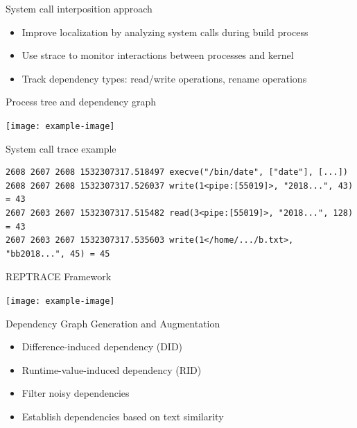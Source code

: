 \documentclass{beamer}
\begin{document}
\begin{frame}{System call interposition approach}
\begin{itemize}
\item Improve localization by analyzing system calls during build process
\item Use strace to monitor interactions between processes and kernel
\item Track dependency types: read/write operations, rename operations
\end{itemize}
\end{frame}

\begin{frame}{Process tree and dependency graph}
\begin{center}
\texttt{[image: example-image]}
\end{center}
\end{frame}

\begin{frame}[fragile]{System call trace example}
\begin{scriptsize}
\begin{verbatim}
2608 2607 2608 1532307317.518497 execve("/bin/date", ["date"], [...])
2608 2607 2608 1532307317.526037 write(1<pipe:[55019]>, "2018...", 43) = 43
2607 2603 2607 1532307317.515482 read(3<pipe:[55019]>, "2018...", 128) = 43
2607 2603 2607 1532307317.535603 write(1</home/.../b.txt>, "bb2018...", 45) = 45
\end{verbatim}
\end{scriptsize}
\end{frame}

\begin{frame}{REPTRACE Framework}
\begin{center}
\texttt{[image: example-image]}
\end{center}
\end{frame}

\begin{frame}{Dependency Graph Generation and Augmentation}
\begin{itemize}
\item Difference-induced dependency (DID)
\item Runtime-value-induced dependency (RID)
\item Filter noisy dependencies
\item Establish dependencies based on text similarity
\end{itemize}
\end{frame}
\end{document}
